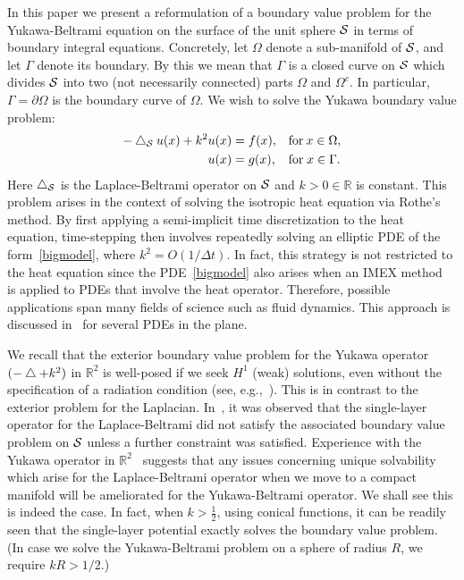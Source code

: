 In this paper we present a reformulation of a boundary value problem
for the Yukawa-Beltrami equation on the surface of the unit sphere
$\S$  in terms of boundary integral equations. Concretely, let $\Omega$
denote a sub-manifold of $\S$, and let $\Gamma$ denote its boundary. By
this we mean that $\Gamma$ is a closed curve  on $\S$ which divides
$\S$ into two (not necessarily connected) parts $\Omega$ and
$\Omega^{c}$. In particular, $\Gamma = \partial\Omega$ is the boundary
curve of $\Omega$. We wish to solve the Yukawa boundary value problem:
\begin{subequations}
\label{bigmodel}
  \begin{align}
    -\lap_\S u(x)+k^2  u(x)&= f({ x}), && \mbox{for} \: x \in \Omega, \\
    u(x)&=g(x), &&\mbox{for} \; x \in \Gamma. 
  \end{align}
\end{subequations}
Here $\lap_{\S}$ is the Laplace-Beltrami operator on $\S$ and $k>0 \in
\mathbb{R}$ is constant. This  problem arises in the context of solving
the isotropic heat equation via Rothe's method.  By first applying a
semi-implicit time discretization to the heat equation, time-stepping
then involves repeatedly solving an elliptic PDE of the
form~\eqref{bigmodel}, where $k^2 = O(1/\Delta t)$.  In fact, this
strategy is not restricted to the heat equation since the
PDE~\eqref{bigmodel} also arises when an IMEX
method~\cite{asc:ruu:wet1995} is applied to PDEs that involve the heat
operator.  Therefore, possible applications span many fields of science
such as fluid dynamics.  This approach is discussed in~\cite{rothe:heat}
for several PDEs in the plane.

We recall that the exterior boundary value problem for the Yukawa
operator $(-\lap + k^2)$  in $\mathbb{R}^2$ is well-posed if we seek
$H^1$ (weak) solutions, even without the specification of a radiation
condition (see, e.g.,~\cite{gatica}). This is in contrast to the
exterior problem for the Laplacian.  In~\cite{gemmrich}, it was observed
that the single-layer operator for the Laplace-Beltrami did not satisfy
the associated boundary value problem on $\S$ unless a further
constraint was satisfied. Experience with the Yukawa operator in
$\mathbb{R}^2$~\cite{kro:qua2011,qua2011} suggests that any issues
concerning unique solvability which arise for the Laplace-Beltrami
operator when we move to a compact manifold will be ameliorated for the
Yukawa-Beltrami operator.  We shall see this is indeed the case. In
fact, when $k>\frac{1}{2}$, using conical functions, it can be readily
seen that the single-layer potential exactly solves the boundary value
problem.  (In case we solve the Yukawa-Beltrami problem on a sphere of
radius $R$, we require $kR>1/2$.)

